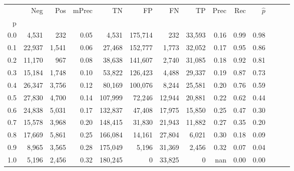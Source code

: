 \begin{tabular}{rrrrrrrrrrrrrr}
\toprule
{} &     Neg &    Pos & mPrec &       TN &       FP &      FN &      TP &  Prec &   Rec & $\hat{p}$ \\
p   &         &        &       &          &          &         &         &       &       &           \\
\midrule
0.0 &   4,531 &    232 &  0.05 &    4,531 &  175,714 &     232 &  33,593 &  0.16 &  0.99 &      0.98 \\
0.1 &  22,937 &  1,541 &  0.06 &   27,468 &  152,777 &   1,773 &  32,052 &  0.17 &  0.95 &      0.86 \\
0.2 &  11,170 &    967 &  0.08 &   38,638 &  141,607 &   2,740 &  31,085 &  0.18 &  0.92 &      0.81 \\
0.3 &  15,184 &  1,748 &  0.10 &   53,822 &  126,423 &   4,488 &  29,337 &  0.19 &  0.87 &      0.73 \\
0.4 &  26,347 &  3,756 &  0.12 &   80,169 &  100,076 &   8,244 &  25,581 &  0.20 &  0.76 &      0.59 \\
0.5 &  27,830 &  4,700 &  0.14 &  107,999 &   72,246 &  12,944 &  20,881 &  0.22 &  0.62 &      0.44 \\
0.6 &  24,838 &  5,031 &  0.17 &  132,837 &   47,408 &  17,975 &  15,850 &  0.25 &  0.47 &      0.30 \\
0.7 &  15,578 &  3,968 &  0.20 &  148,415 &   31,830 &  21,943 &  11,882 &  0.27 &  0.35 &      0.20 \\
0.8 &  17,669 &  5,861 &  0.25 &  166,084 &   14,161 &  27,804 &   6,021 &  0.30 &  0.18 &      0.09 \\
0.9 &   8,965 &  3,565 &  0.28 &  175,049 &    5,196 &  31,369 &   2,456 &  0.32 &  0.07 &      0.04 \\
1.0 &   5,196 &  2,456 &  0.32 &  180,245 &        0 &  33,825 &       0 &   nan &  0.00 &      0.00 \\
\bottomrule
\end{tabular}
